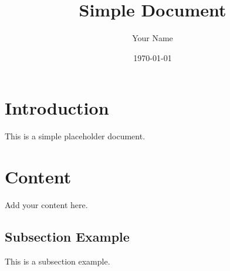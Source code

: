 \documentclass{article}
\title{Simple Document}
\author{Your Name}
\date{\today}
\begin{document}
\maketitle

\section{Introduction}
This is a simple placeholder document.

\section{Content}
Add your content here.

\subsection{Subsection Example}
This is a subsection example.
\end{document}
